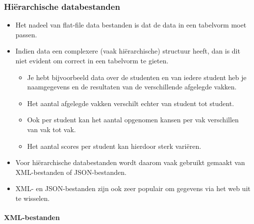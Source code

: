 \documentclass[]{tufte-book}
\providecommand{\tightlist}{%
  \setlength{\itemsep}{0pt}\setlength{\parskip}{0pt}}
\begin{document}
\hypertarget{hiuxebrarchische-databestanden}{%
\subsubsection{Hiërarchische databestanden}\label{hiuxebrarchische-databestanden}}

\begin{itemize}
\tightlist
\item
  Het nadeel van flat-file data bestanden is dat de data in een tabelvorm moet passen.
\item
  Indien data een complexere (vaak hiërarchische) structuur heeft, dan is dit niet evident om correct in een tabelvorm te gieten.

  \begin{itemize}
  \tightlist
  \item
    Je hebt bijvoorbeeld data over de studenten en van iedere student heb je naamgegevens en de resultaten van de verschillende afgelegde vakken.
  \item
    Het aantal afgelegde vakken verschilt echter van student tot student.
  \item
    Ook per student kan het aantal opgenomen kansen per vak verschillen van vak tot vak.
  \item
    Het aantal scores per student kan hierdoor sterk variëren.
  \end{itemize}
\item
  Voor hiërarchische databestanden wordt daarom vaak gebruikt gemaakt van XML-bestanden of JSON-bestanden.
\item
  XML- en JSON-bestanden zijn ook zeer populair om gegevens via het web uit te wisselen.
\end{itemize}

\hypertarget{xml-bestanden}{%
\paragraph{XML-bestanden}\label{xml-bestanden}}
\end{document}
